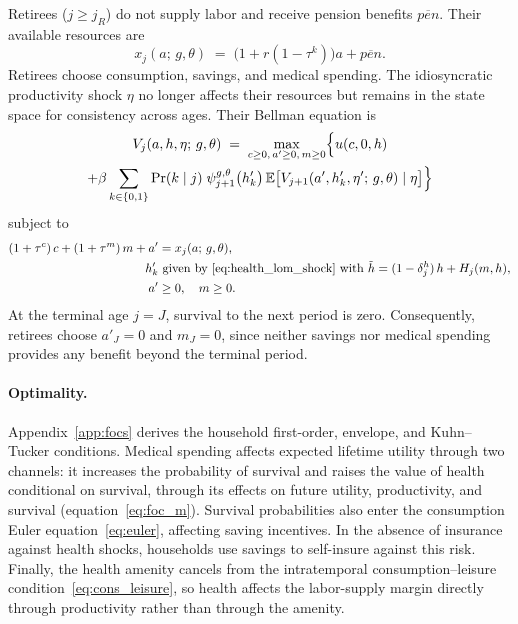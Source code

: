 \documentclass[12pt,a4paper]{article}
\newcommand{\E}{\mathbb{E}}
\begin{document}
Retirees ($j \geq j_R$) do not supply labor and receive pension benefits $\overline{pen}$. Their available resources are
\begin{equation}
\label{eq:resources_retiree}
x_j(a;\, g, \theta) \;=\; \bigl(1 + r(1-\tau^k)\bigr) a + \overline{pen}.
\end{equation}
Retirees choose consumption, savings, and medical spending. The idiosyncratic productivity shock $\eta$ no longer affects their resources but remains in the state space for consistency across ages. Their Bellman equation is
\begin{multline}
\label{eq:retiree_bellman}
V_j(a, h, \eta;\, g, \theta)
\;=\;
\max_{c \geq 0,\, a' \geq 0,\, m \geq 0}
\Bigl\{
u(c, 0, h)
\\
+ \beta \sum_{k \in \{0,1\}} \Pr(k \mid j)\;
\psi_{j+1}^{g,\theta}\bigl(h'_k\bigr)\,
\E\bigl[V_{j+1}(a', h'_k, \eta';\, g, \theta) \mid \eta\bigr]
\Bigr\}
\end{multline}
subject to
\begin{align}
(1 + \tau^c)\, c + (1 + \tau^m)\, m + a' &= x_j(a;\, g, \theta), \label{eq:retiree_budget}\\
h'_k &\ \text{given by~\eqref{eq:health_lom_shock} with } \tilde h = (1 - \delta_j^h)\, h + H_j(m, h), \label{eq:retiree_health}\\
a' &\geq 0,\quad m \geq 0. \label{eq:retiree_borrow}
\end{align}
At the terminal age $j=J$, survival to the next period is zero. Consequently, retirees choose $a'_J=0$ and $m_J=0$, since neither savings nor medical spending provides any benefit beyond the terminal period.


\paragraph{Optimality.}
Appendix~\ref{app:focs} derives the household first-order, envelope, and Kuhn--Tucker conditions. Medical spending affects expected lifetime utility through two channels: it increases the probability of survival and raises the value of health conditional on survival, through its effects on future utility, productivity, and survival (equation~\eqref{eq:foc_m}). Survival probabilities also enter the consumption Euler equation~\eqref{eq:euler}, affecting saving incentives. In the absence of insurance against health shocks, households use savings to self-insure against this risk. Finally, the health amenity cancels from the intratemporal consumption--leisure condition~\eqref{eq:cons_leisure}, so health affects the labor-supply margin directly through productivity rather than through the amenity.
\end{document}
